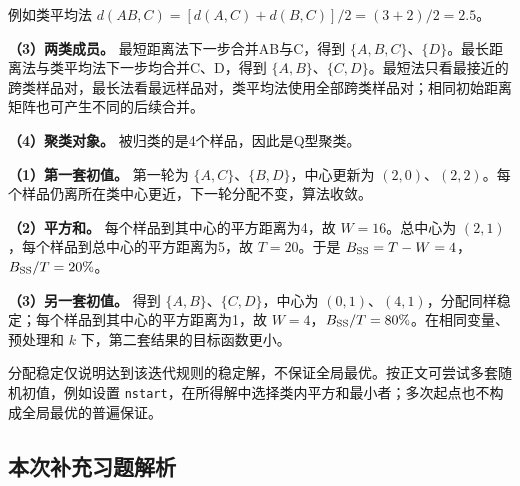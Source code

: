 例如类平均法 \(d(AB,C)=[d(A,C)+d(B,C)]/2=(3+2)/2=2.5\)。

\textbf{（3）两类成员。} 最短距离法下一步合并AB与C，得到 \(\{A,B,C\}\)、\(\{D\}\)。最长距离法与类平均法下一步均合并C、D，得到 \(\{A,B\}\)、\(\{C,D\}\)。最短法只看最接近的跨类样品对，最长法看最远样品对，类平均法使用全部跨类样品对；相同初始距离矩阵也可产生不同的后续合并。

\textbf{（4）聚类对象。} 被归类的是4个样品，因此是Q型聚类。





\textbf{（1）第一套初值。} 第一轮为 \(\{A,C\}\)、\(\{B,D\}\)，中心更新为 \((2,0)\)、\((2,2)\)。每个样品仍离所在类中心更近，下一轮分配不变，算法收敛。

\textbf{（2）平方和。} 每个样品到其中心的平方距离为4，故 \(W=16\)。总中心为 \((2,1)\)，每个样品到总中心的平方距离为5，故 \(T=20\)。于是 \(B_{\rm SS}=T-W=4\)，\(B_{\rm SS}/T=20\%\)。

\textbf{（3）另一套初值。} 得到 \(\{A,B\}\)、\(\{C,D\}\)，中心为 \((0,1)\)、\((4,1)\)，分配同样稳定；每个样品到其中心的平方距离为1，故 \(W=4\)，\(B_{\rm SS}/T=80\%\)。在相同变量、预处理和 \(k\) 下，第二套结果的目标函数更小。

分配稳定仅说明达到该迭代规则的稳定解，不保证全局最优。按正文可尝试多套随机初值，例如设置 \texttt{nstart}，在所得解中选择类内平方和最小者；多次起点也不构成全局最优的普遍保证。
\subsection*{本次补充习题解析}

\EndExercises
